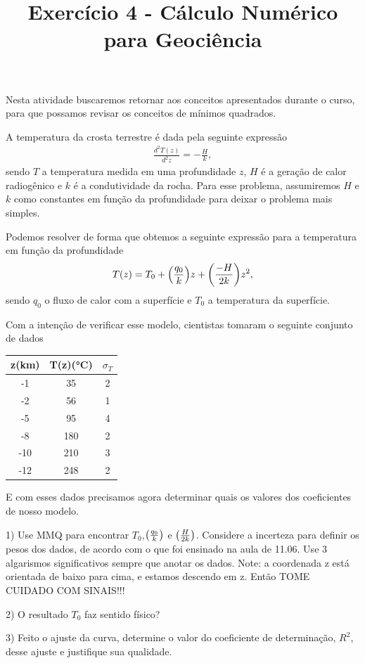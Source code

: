 \documentclass{article}
\title{Exercício 4  -  Cálculo Numérico para Geociência}
\begin{document}
\maketitle

Nesta atividade buscaremos retornar aos conceitos apresentados durante o curso, para que possamos revisar os conceitos de mínimos quadrados.

A temperatura da crosta terrestre é dada pela seguinte expressão
\begin{align}
    \label{eq: EDO_crosta}
    \frac{d^2T(z)}{d^2z} = -\frac{H}{k},
\end{align}
sendo $T$ a temperatura medida em uma profundidade $z$, $H$ é a geração de calor radiogênico e $k$ é a condutividade da rocha. Para esse problema, assumiremos $H$ e $k$ como constantes em função da profundidade para  deixar o problema mais simples.

Podemos resolver de forma que obtemos a seguinte expressão para a temperatura em função da profundidade
\begin{align}
    T(z) = T_0 + \qty(\frac{q_0}{k})z + \qty(\frac{-H}{2k})z^2,
\end{align}
sendo $q_0$ o fluxo de calor com a superfície e $T_0$ a temperatura da superfície.


Com a intenção de verificar esse modelo, cientistas tomaram o seguinte conjunto de dados
\begin{table}[h!]
    \centering
    \begin{tabular}{|c|c|c|}
       \hline
       z(km)& T(z)(°C) & $\sigma_T$\\
       \hline
       -1 & 35 & 2\\
       -2 & 56 & 1\\
       -5 & 95 & 4\\
       -8 & 180& 2\\
       -10& 210& 3\\
       -12& 248& 2\\
       \hline
    \end{tabular}
    \label{tab:placeholder}
\end{table}

E com esses dados precisamos agora determinar quais os valores dos coeficientes de nosso modelo.


1) Use MMQ para encontrar $T_0 $,$ \qty(\frac{q_0}{k}) $ e $\qty(\frac{H}{2k})$. Considere a incerteza para definir os pesos dos dados, de acordo com o que foi ensinado na aula de 11.06. Use 3 algarismos significativos sempre que anotar os dados. Note: a coordenada z está orientada de baixo para cima, e estamos descendo em z. Então TOME CUIDADO COM SINAIS!!!

2) O resultado $T_0$ faz sentido físico?

3) Feito o ajuste da curva, determine o valor do coeficiente de determinação, $R^2$, desse ajuste e justifique sua qualidade.
\end{document}
